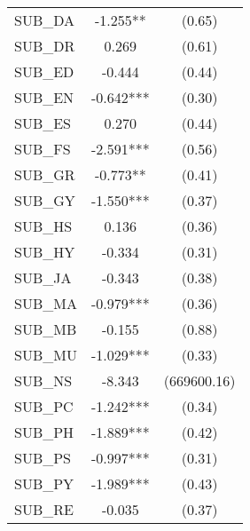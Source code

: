 \begin{table}[H]
\begin{threeparttable}
\begin{tabular}{l c c}
      SUB\_DA                               & -1.255**               & (0.65)               \\
      SUB\_DR                               & 0.269                  & (0.61)               \\
      SUB\_ED                               & -0.444                 & (0.44)               \\
      SUB\_EN                               & -0.642***              & (0.30)               \\
      SUB\_ES                               & 0.270                  & (0.44)               \\
      SUB\_FS                               & -2.591***              & (0.56)               \\
      SUB\_GR                               & -0.773**               & (0.41)               \\
      SUB\_GY                               & -1.550***              & (0.37)               \\
      SUB\_HS                               & 0.136                  & (0.36)               \\
      SUB\_HY                               & -0.334                 & (0.31)               \\
      SUB\_JA                               & -0.343                 & (0.38)               \\
      SUB\_MA                               & -0.979***              & (0.36)               \\
      SUB\_MB                               & -0.155                 & (0.88)               \\
      SUB\_MU                               & -1.029***              & (0.33)               \\
      SUB\_NS                               & -8.343                 & (669600.16)          \\
      SUB\_PC                               & -1.242***              & (0.34)               \\
      SUB\_PH                               & -1.889***              & (0.42)               \\
      SUB\_PS                               & -0.997***              & (0.31)               \\
      SUB\_PY                               & -1.989***              & (0.43)               \\
      SUB\_RE                               & -0.035                 & (0.37)               \\

\end{tabular}
\end{threeparttable}
\end{table}
